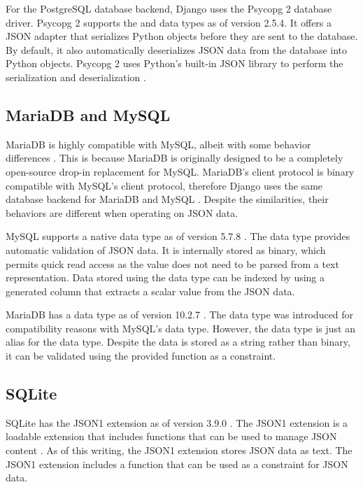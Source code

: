 For the PostgreSQL database backend, Django uses the Psycopg 2 database driver.
Psycopg 2 supports the  and  data types as of version
2.5.4. It offers a JSON adapter that serializes Python objects before they are
sent to the database. By default, it also automatically deserializes JSON data
from the database into Python objects. Psycopg 2 uses Python's built-in JSON
library to perform the serialization and deserialization
\cite{psycopg2:json-adaptation}.

\subsection{MariaDB and MySQL}

MariaDB is highly compatible with MySQL, albeit with some behavior differences
\cite{mariadb:compatibility}. This is because MariaDB is originally designed to
be a completely open-source drop-in replacement for MySQL. MariaDB's client
protocol is binary compatible with MySQL's client protocol, therefore Django
uses the same database backend for MariaDB and MySQL \cite{django:databases}.
Despite the similarities, their behaviors are different when operating on JSON
data.

MySQL supports a native  data type as of version 5.7.8
\cite{mysql:json}. The  data type provides automatic validation of
JSON data. It is internally stored as binary, which permits quick read access
as the value does not need to be parsed from a text representation. Data stored
using the  data type can be indexed by using a generated column that
extracts a scalar value from the JSON data.

MariaDB has a  data type as of version 10.2.7 \cite{mariadb:json}.
The  data type was introduced for compatibility reasons with MySQL's
 data type. However, the  data type is just an alias for
the  data type. Despite the data is stored as a string rather
than binary, it can be validated using the provided  function
as a  constraint.

\subsection{SQLite}

SQLite has the JSON1 extension as of version 3.9.0 \cite{sqlite:3.9.0}. The
JSON1 extension is a loadable extension that includes functions that can be
used to manage JSON content \cite{sqlite:json1}. As of this writing, the JSON1
extension stores JSON data as text. The JSON1 extension includes a
 function that can be used as a  constraint for
JSON data.

